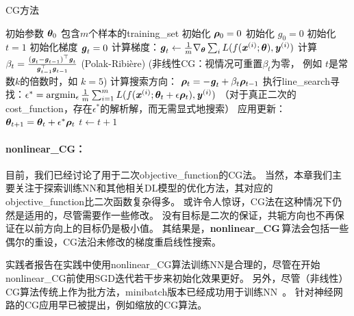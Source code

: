 \begin{algorithm}[ht]
\caption{\gls{CG}方法}
\label{alg:cg}
\begin{algorithmic}
\REQUIRE 初始参数 $\boldsymbol{\theta}_{0}$
\REQUIRE 包含$m$个样本的\gls{training_set}
\STATE 初始化 $\boldsymbol{\rho}_{0} = 0$
\STATE 初始化 $g_0 = 0$
\STATE 初始化 $t = 1$
    \STATE 初始化梯度 ${\boldsymbol{\mathit{g}}}_{t} = 0$
    \STATE 计算梯度：$\boldsymbol{\mathit{g}}_{t} \leftarrow
         \frac{1}{m}\nabla_{\boldsymbol{\theta}} \sum_i L(f(\boldsymbol{\mathit{x}}^{(i)};\boldsymbol{\theta}),\boldsymbol{\mathit{y}}^{(i)})$ 
    \STATE 计算 $\beta_{t} = \frac{(\boldsymbol{\mathit{g}}_{t}-\boldsymbol{\mathit{g}}_{t-1})^\top \boldsymbol{\mathit{g}}_{t}}{\boldsymbol{\mathit{g}}_{t-1}^\top \boldsymbol{\mathit{g}}_{t-1}}$  (Polak-Ribi\`{e}re)
    \STATE (非线性\gls{CG}：视情况可重置$\beta_{t}$为零，
           例如  $t$是常数$k$的倍数时，如 $k=5$)
    \STATE 计算搜索方向： $\boldsymbol{\rho}_{t} = -\boldsymbol{\mathit{g}}_{t} + \beta_{t} \boldsymbol{\rho}_{t-1}$ 
    \STATE 执行\gls{line_search}寻找：$\epsilon^{*} = \arg\!\min_{\epsilon}
    \frac{1}{m} \sum_{i=1}^{m}L(f(\boldsymbol{\mathit{x}}^{(i)};\boldsymbol{\theta}_t + \epsilon \boldsymbol{\rho}_t),\boldsymbol{\mathit{y}}^{(i)})$ 
    \STATE （对于真正二次的\gls{cost_function}，存在$\epsilon^*$的解析解，而无需显式地搜索）
    \STATE 应用更新：$\boldsymbol{\theta}_{t+1} = \boldsymbol{\theta}_{t}+ \epsilon^{*} \boldsymbol{\rho}_{t}$
    \STATE $t \leftarrow t + 1$
\ENDWHILE
\end{algorithmic}
\end{algorithm}


\paragraph{\gls{nonlinear_CG}：}
目前，我们已经讨论了用于二次\gls{objective_function}的\gls{CG}法。
当然，本章我们主要关注于探索训练\gls{NN}和其他相关\gls{DL}模型的优化方法，其对应的\gls{objective_function}比二次函数复杂得多。
或许令人惊讶，\gls{CG}法在这种情况下仍然是适用的，尽管需要作一些修改。
没有目标是二次的保证，共轭方向也不再保证在以前方向上的目标仍是极小值。
其结果是，\textbf{\gls{nonlinear_CG}}\,算法会包括一些偶尔的重设，\gls{CG}法沿未修改的梯度重启线性搜索。


实践者报告在实践中使用\gls{nonlinear_CG}算法训练\gls{NN}是合理的，尽管在开始\gls{nonlinear_CG}前使用\gls{SGD}迭代若干步来初始化效果更好。
另外，尽管（非线性）\gls{CG}算法传统上作为批方法，\gls{minibatch}版本已经成功用于训练\gls{NN}~\citep{LeRoux-chapter-2011}。
针对神经网路的\gls{CG}应用早已被提出，例如缩放的\gls{CG}算法\citep{Moller}。

